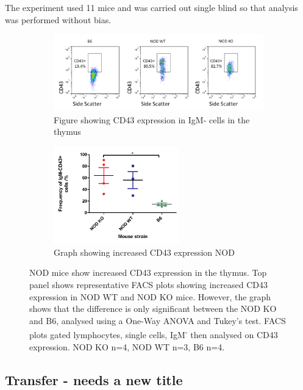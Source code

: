 The experiment used 11 mice and was carried out single blind so that analysis was performed without bias.

\begin{figure}
	\begin{subfigure}{\textwidth}
	\includegraphics[width=\textwidth]{Figures/CD43expression.png}
	\caption{Figure showing CD43 expression in IgM- cells in the thymus}
	\end{subfigure}
	\begin{subfigure}{\textwidth}
	\centering
	\includegraphics[width=0.6\textwidth]{Figures/CD43levels.pdf}
	\caption{Graph showing increased CD43 expression NOD}
	\end{subfigure}
\caption{NOD mice show increased CD43 expression in the thymus.
Top panel shows representative FACS plots showing increased CD43 expression in NOD WT and NOD KO mice.
However, the graph shows that the difference is only significant between the NOD KO and B6, analysed using a One-Way ANOVA and Tukey's test.
FACS plots gated lymphocytes, single cells, IgM\textsuperscript{-} then analysed on CD43 expression.
NOD KO n=4, NOD WT n=3, B6 n=4. }
\label{fig:CD43expression}
\end{figure}


\subsection{Transfer - needs a new title}

